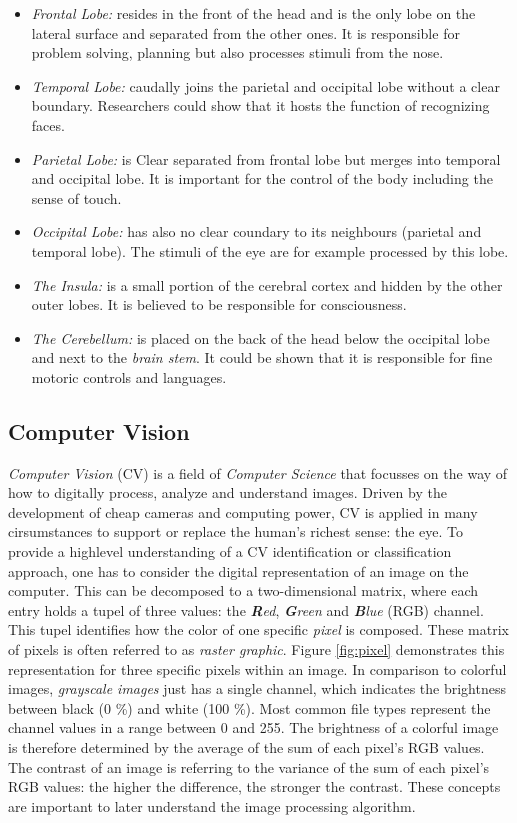 \documentclass[twoside,11pt]{article}
\begin{document}
\begin{itemize}
	\item \textit{Frontal Lobe:} resides in the front of the head and is the only lobe on the lateral surface and separated from the other ones. It is responsible for problem solving, planning but also processes stimuli from the nose. 
	\item \textit{Temporal Lobe:} caudally joins the parietal and occipital lobe without a clear boundary. Researchers could show that it hosts the function of recognizing faces.
	\item \textit{Parietal Lobe:} is Clear separated from frontal lobe but merges into temporal and occipital lobe. It is important for the control of the body including the sense of touch.
	\item \textit{Occipital Lobe:} has also no clear coundary to its neighbours (parietal and temporal lobe). The stimuli of the eye are for example processed by this lobe.
	\item \textit{The Insula:} is a small portion of the cerebral cortex and hidden by the other outer lobes. It is believed to be responsible for  consciousness.
	\item \textit{The Cerebellum:} is placed on the back of the head below the occipital lobe and next to the \textit{brain stem}. It could be shown that it is responsible for fine motoric controls and languages.
\end{itemize}
\citep{duvernoy2012human}

\subsection{Computer Vision}
\label{cv}
\textit{Computer Vision} (CV) is a field of \textit{Computer Science} that focusses on the way of how to digitally process, analyze and understand images. Driven by the development of cheap cameras and computing power, CV is applied in many cirsumstances to support or replace the human's richest sense: the eye.
To provide a highlevel understanding of a CV identification or classification approach, one has to consider the digital representation of an image on the computer. This can be decomposed to a two-dimensional matrix, where each entry holds a tupel of three values: the \textit{\textbf{R}ed}, \textit{\textbf{G}reen} and \textit{\textbf{B}lue} (RGB) channel. This tupel identifies how the color of one specific \textit{pixel} is composed. These matrix of pixels is often referred to as \textit{raster graphic}. Figure \ref{fig:pixel} demonstrates this representation for three specific pixels within an image. In comparison to colorful images, \textit{grayscale images} just has a single channel, which indicates the brightness between black (0 \%) and white (100 \%). Most common file types represent the  channel values  in a range between 0 and 255. The brightness of a colorful image is therefore determined by the average of the sum of each pixel's RGB values. The contrast of an image is referring to the variance of the sum of each pixel's RGB values: the higher the difference, the stronger the contrast. These concepts are important to later understand the image processing algorithm.
\end{document}
